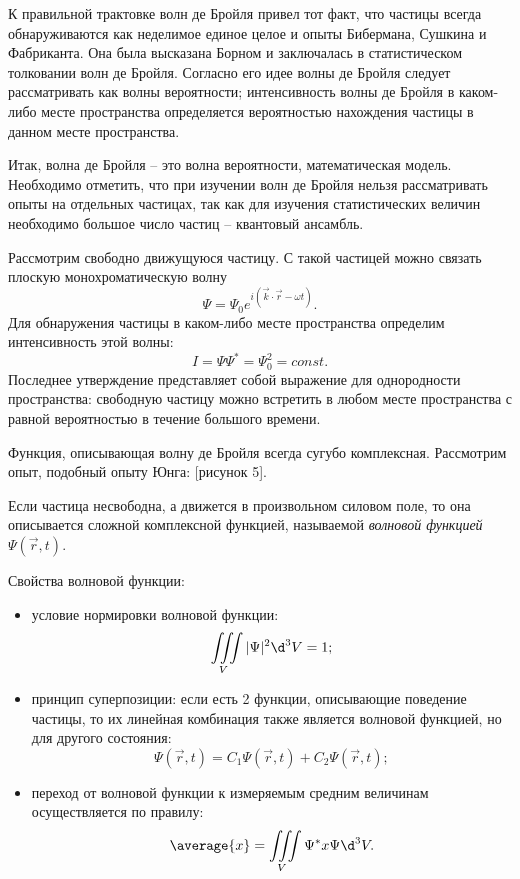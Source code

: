 К правильной трактовке волн де Бройля привел тот факт, что частицы всегда
обнаруживаются как неделимое единое целое и опыты Бибермана, Сушкина и
Фабриканта. Она была высказана Борном и заключалась в статистическом толковании
волн де Бройля. Согласно его идее волны де Бройля следует рассматривать как
волны вероятности; интенсивность волны де Бройля в каком-либо месте пространства
определяется вероятностью нахождения частицы в данном месте пространства.

Итак, волна де Бройля -- это волна вероятности, математическая модель.
Необходимо отметить, что при изучении волн де Бройля нельзя рассматривать опыты
на отдельных частицах, так как для изучения статистических величин необходимо
большое число частиц -- квантовый ансамбль.

Рассмотрим свободно движущуюся частицу. С такой частицей можно связать плоскую
монохроматическую волну
\[
    \Psi = \Psi_0 e^{i(\vec{k}\cdot\vec{r} - \omega t)}.
\]
Для обнаружения частицы в каком-либо месте пространства определим интенсивность
этой волны:
\[
    I = \Psi\Psi^* = \Psi_0^2 = const.
\]
Последнее утверждение представляет собой выражение для однородности
пространства: свободную частицу можно встретить в любом месте пространства с
равной вероятностью в течение большого времени.

Функция, описывающая волну де Бройля всегда сугубо комплексная. Рассмотрим опыт,
подобный опыту Юнга: [рисунок 5].

Если частица несвободна, а движется в произвольном силовом поле, то она
описывается сложной комплексной функцией, называемой \emph{волновой функцией}
\( \Psi(\vec{r}, t) \).

Свойства волновой функции:
\begin{itemize}
    \item условие нормировки волновой функции:
        \[
            \iiint\limits_V |\Psi|^2 \d^3 V = 1;
        \]
    \item принцип суперпозиции: если есть 2 функции, описывающие поведение
        частицы, то их линейная комбинация также  является волновой функцией,
        но для другого состояния:
    \[
        \Psi(\vec{r}, t) = C_1\Psi(\vec{r}, t) + C_2\Psi(\vec{r}, t);
    \]
    \item переход от волновой функции к измеряемым средним величинам
        осуществляется по правилу: 
    \[
        \average{x} = \iiint\limits_V \Psi^* x \Psi \d^3 V.
    \]
\end{itemize}

